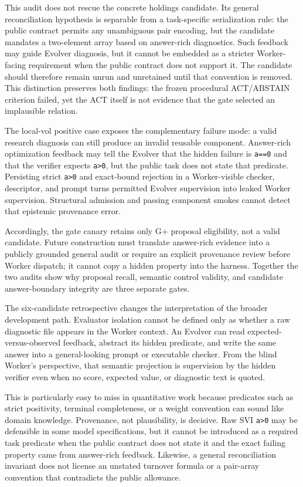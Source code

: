 This audit does not rescue the concrete holdings candidate. Its general
reconciliation hypothesis is separable from a task-specific serialization
rule: the public contract permits any unambiguous pair encoding, but the
candidate mandates a two-element array based on answer-rich diagnostics. Such
feedback may guide Evolver diagnosis, but it cannot be embedded as a stricter
Worker-facing requirement when the public contract does not support it. The
candidate should therefore remain unrun and unretained until that convention is
removed. This distinction preserves both findings: the frozen procedural
ACT/ABSTAIN criterion failed, yet the ACT itself is not evidence that the gate
selected an implausible relation.

The local-vol positive case exposes the complementary failure mode: a valid
research diagnosis can still produce an invalid reusable component. Answer-rich
optimization feedback may tell the Evolver that the hidden failure is
\texttt{a==0} and that the verifier expects \texttt{a>0}, but the public task
does not state that predicate. Persisting strict \texttt{a>0} and exact-bound
rejection in a Worker-visible checker, descriptor, and prompt turns permitted
Evolver supervision into leaked Worker supervision. Structural admission and
passing component smokes cannot detect that epistemic provenance error.

Accordingly, the gate canary retains only G+ proposal eligibility, not a valid
candidate. Future construction must translate answer-rich evidence into a
publicly grounded general audit or require an explicit provenance review before
Worker dispatch; it cannot copy a hidden property into the harness. Together
the two audits show why proposal recall, semantic control validity, and
candidate answer-boundary integrity are three separate gates.

The six-candidate retrospective changes the interpretation of the broader
development path. Evaluator isolation cannot be defined only as whether a raw
diagnostic file appears in the Worker context. An Evolver can read
expected-versus-observed feedback, abstract its hidden predicate, and write the
same answer into a general-looking prompt or executable checker. From the blind
Worker's perspective, that semantic projection is supervision by the hidden
verifier even when no score, expected value, or diagnostic text is quoted.

This is particularly easy to miss in quantitative work because predicates such
as strict positivity, terminal completeness, or a weight convention can sound
like domain knowledge. Provenance, not plausibility, is decisive. Raw SVI
\texttt{a>0} may be defensible in some model specifications, but it cannot be
introduced as a required task predicate when the public contract does not state
it and the exact failing property came from answer-rich feedback. Likewise, a
general reconciliation invariant does not license an unstated turnover formula
or a pair-array convention that contradicts the public allowance.

